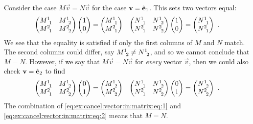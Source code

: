 \documentclass[12pt]{article}
\begin{document}
\begin{example}\label{ex:cancel:vector:in:matrix:equation}
Consider the case $M\vec{v} = N\vec{v}$ for the case $\mathbf{v} = \hat{\mathbf{e}}_1$. This sets two vectors equal:
\begin{align}
    \begin{pmatrix}
        M\aij 11  & M\aij 12 \\
        M\aij 21  &  M\aij 22
    \end{pmatrix}
    \begin{pmatrix}
        1 \\ 0
    \end{pmatrix}
    &= 
    \begin{pmatrix}
        M\aij 11 \\ M\aij 21
    \end{pmatrix} 
    &
    \begin{pmatrix}
        N\aij 11  & N\aij 12 \\
        N\aij 21  & N\aij 22
    \end{pmatrix}
    \begin{pmatrix}
        1 \\ 0
    \end{pmatrix}
    = 
    \begin{pmatrix}
        N\aij 11 \\ N\aij 21
    \end{pmatrix} 
    \ .
    \label{eq:ex:cancel:vector:in:matrix:eq:1}
\end{align}
We see that the equality is satisfied if only the first columns of $M$ and $N$ match. The second columns could differ, say $M\aij 12 \neq N\aij 12$, and so we cannot conclude that $M=N$. However, if we say that $M\vec{v} = N\vec{v}$ for \emph{every} vector $\vec{v}$, then we could also check $\mathbf{v} = \hat{\mathbf{e}}_2$ to find
\begin{align}
    \begin{pmatrix}
        M\aij 11  & M\aij 12 \\
        M\aij 21  &  M\aij 22
    \end{pmatrix}
    \begin{pmatrix}
        0 \\ 1
    \end{pmatrix}
    &= 
    \begin{pmatrix}
        M\aij 12 \\ M\aij 22
    \end{pmatrix} 
    &
    \begin{pmatrix}
        N\aij 11  & N\aij 12 \\
        N\aij 21  & N\aij 22
    \end{pmatrix}
    \begin{pmatrix}
        0 \\ 1
    \end{pmatrix}
    = 
    \begin{pmatrix}
        N\aij 12 \\ N\aij 22
    \end{pmatrix} 
    \ .
    \label{eq:ex:cancel:vector:in:matrix:eq:2}
\end{align}
The combination of \eqref{eq:ex:cancel:vector:in:matrix:eq:1} and \eqref{eq:ex:cancel:vector:in:matrix:eq:2} means that $M=N$.
\end{example}
\end{document}
